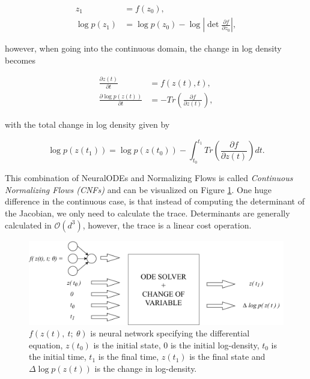 \begin{align}
    z_{1} &= f(z_{0}), \\
    \log p(z_{1}) &= \log p(z_{0}) - \log \left \lvert \det \frac{\partial f}{\partial z_{0}} \right \rvert,
\end{align}

however, when going into the continuous domain, the change in log density becomes

\begin{align}
    \frac{\partial z(t)}{\partial t} &= f(z(t), t), \\
    \frac {\partial \log p(z(t))} {\partial t} &= -Tr \left( \frac{\partial f}{\partial z(t)} \right),
\end{align}

with the total change in log density given by

\begin{displaymath}
    \log p(z(t_1)) = \log p(z(t_0)) - \int_{t_0}^{t_1} Tr \left( \frac{\partial f}{\partial z(t)} \right) dt.    
\end{displaymath}

This combination of NeuralODEs and Normalizing Flows is called \emph{Continuous Normalizing Flows (CNFs)} and can be visualized on Figure \ref{figure:cnf:cnfs_visualization}. One huge difference in the continuous case, is that instead of computing the determinant of the Jacobian, we only need to calculate the trace. Determinants are generally calculated in $ \mathcal{O}(d^3) $, however, the trace is a linear cost operation.

\begin{figure}[ht]
      \centering
      \includegraphics[width=\columnwidth]{figures/cnfs_visualization.pdf}
      \caption{$f(z(t), \ t; \ \theta) $ is neural network specifying the differential equation, $ z(t_0) $ is the initial state, $ 0 $ is the initial log-density, $ t_0 $ is the initial time, $ t_1 $ is the final time, $ z(t_1) $ is the final state and $ \Delta \log p(z(t)) $ is the change in log-density.}
      \label{figure:cnf:cnfs_visualization}
\end{figure}

